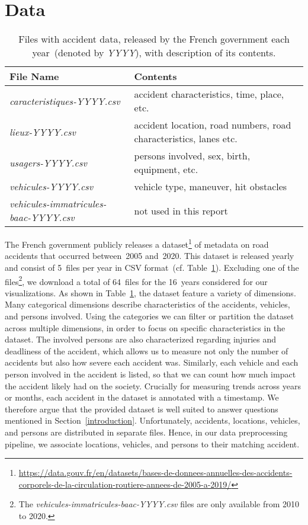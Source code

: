 \section{Data}
\label{data}
\begin{table}
    \caption{Files with accident data, released by the French government each year~(denoted by \textit{YYYY}), with description of its contents.}
    \label{table-files}
    \begin{tabularx}{\linewidth}{lX}
        \toprule
        \textbf{File Name} & \textbf{Contents} \\
        \midrule
        \textit{caracteristiques-YYYY.csv} & accident characteristics, time, place, etc. \\
        \textit{lieux-YYYY.csv} & accident location, road numbers, road characteristics, lanes etc. \\
        \textit{usagers-YYYY.csv} & persons involved, sex, birth, equipment, etc. \\
        \textit{vehicules-YYYY.csv} & vehicle type, maneuver, hit obstacles \\
        \textit{vehicules-immatricules-baac-YYYY.csv} & not used in this report \\
        \bottomrule
    \end{tabularx}
\end{table}
The French government publicly releases a dataset\footnote{\url{https://data.gouv.fr/en/datasets/bases-de-donnees-annuelles-des-accidents-corporels-de-la-circulation-routiere-annees-de-2005-a-2019/}} of  metadata on road accidents that occurred between~2005 and~2020. This dataset is released yearly and consist of 5~files per year in CSV format~(cf. Table~\ref{table-files}). Excluding one of the files\footnote{The \textit{vehicules-immatricules-baac-YYYY.csv} files are only available from 2010 to 2020.}, we download a total of 64~files for the 16~years considered for our visualizations. As shown in  Table~\ref{table-files}, the dataset feature a variety of dimensions. Many categorical dimensions describe characteristics of the accidents, vehicles, and persons involved. Using the categories we can filter or partition the dataset across multiple dimensions, in order to focus on specific characteristics in the dataset. The involved persons are also characterized regarding injuries and deadliness of the accident, which allows us to measure not only the number of accidents but also how severe each accident was. Similarly, each vehicle and each person involved in the accident is listed, so that we can count how much impact the accident likely had on the society. Crucially for measuring trends across years or months, each accident in the dataset is annotated with a timestamp. We therefore argue that the provided dataset is well suited to answer questions mentioned in Section~\ref{introduction}. Unfortunately, accidents, locations, vehicles, and persons are distributed in separate files. Hence, in our data preprocessing pipeline, we associate locations, vehicles, and persons to their matching accident.


